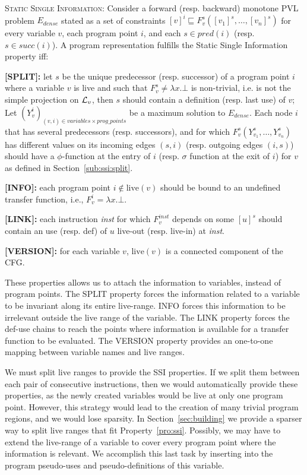 \begin{property}[SSI]
\label{pro:ssi}\textsc{Static Single Information:} Consider a forward (resp. backward) monotone PVL problem $E_{dense}$ stated as a set of constraints $[v]^i \sqsubseteq F_v^s([v_1]^s,\dots,[v_n]^s)$ for every variable $v$, each program point $i$, and each $s \in \mathit{pred}(i)$ (resp. $s\in \mathit{succ}(i)$).
A program representation fulfills the Static Single Information property iff:\begin{description}
\item {\bf [SPLIT]:} let $s$ be the unique predecessor (resp. successor) of a program point $i$ where a variable $v$ is live and such that $F_v^s\neq \lambda x.\bot$ is non-trivial, i.e. is not the simple projection on ${\cal L}_v$, then $s$ should contain a definition (resp. last use) of $v$; 
Let $(Y_v^i)_{(v,i)\in variables\times prog\_points}$ be a maximum solution to $E_{dense}$. 
Each node $i$ that has several predecessors (resp. successors), and for which $F_v^s(Y_{v_1}^s,\dots,Y_{v_n}^s)$ has different values on its incoming edges $(s,i)$ (resp. outgoing edges $(i,s)$) should have a $\phi$-function at the entry of $i$ (resp. $\sigma$ function at the exit of $i$) for $v$
as defined in Section~\ref{sub:ssi:split}.
\item {\bf [INFO]:} each program point $i\not\in \textrm{live}(v)$ should be bound to an undefined  transfer function, i.e., $F_v^i=\lambda x.\bot$.
\item {\bf [LINK]:} each instruction {\em inst} for which $F_v^{inst}$ depends on some $[u]^s$ should contain an use (resp. def) of $u$ live-out (resp. live-in) at
{\em inst}.
\item {\bf [VERSION]:} for each variable $v$, $\textrm{live}(v)$ is a connected component of the CFG.
\end{description}
\end{property}

These properties allows us to attach the information to variables, instead of program points.
The {SPLIT} property forces the information related to a variable to be invariant along its entire live-range.
{INFO} forces this information to be irrelevant outside the live range of the variable.
The {LINK} property forces the def-use chains to reach the points where information is available for a transfer function to be evaluated.
The {VERSION} property provides an one-to-one mapping between variable names and live ranges.

We must split live ranges to provide the SSI properties.
If we split them between each pair of consecutive instructions, then we would automatically provide these properties, as the newly created variables
would be live at only one program point.
However, this strategy would lead to the creation of many trivial program regions, and we would lose sparsity.
In Section~\ref{sec:building} we provide a sparser way to split live ranges that fit Property~\ref{pro:ssi}.
Possibly, we may have to extend the live-range of a variable to cover every program point where the information is relevant.
We accomplish this last task by inserting into the program pseudo-uses and pseudo-definitions of this variable.

